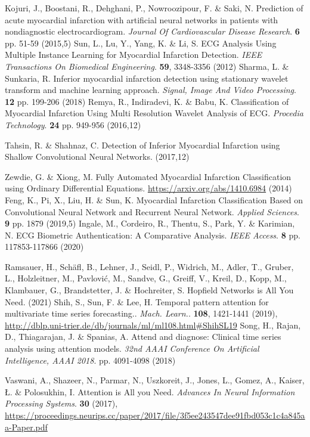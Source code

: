 \documentclass{ieeeaccess}
\begin{document}
\begin{thebibliography}{1}
Kojuri, J., Boostani, R., Dehghani, P., Nowroozipour, F. \& Saki, N. Prediction of acute myocardial infarction with artificial neural networks in patients with nondiagnostic electrocardiogram. {\em Journal Of Cardiovascular Disease Research}. \textbf{6} pp. 51-59 (2015,5)
Sun, L., Lu, Y., Yang, K. \& Li, S. ECG Analysis Using Multiple Instance Learning for Myocardial Infarction Detection. {\em IEEE Transactions On Biomedical Engineering}. \textbf{59}, 3348-3356 (2012)
Sharma, L. \& Sunkaria, R. Inferior myocardial infarction detection using stationary wavelet transform and machine learning approach. {\em Signal, Image And Video Processing}. \textbf{12} pp. 199-206 (2018)
Remya, R., Indiradevi, K. \& Babu, K. Classification of Myocardial Infarction Using Multi Resolution Wavelet Analysis of ECG. {\em Procedia Technology}. \textbf{24} pp. 949-956 (2016,12)

Tahsin, R. \& Shahnaz, C. Detection of Inferior Myocardial Infarction using Shallow Convolutional Neural Networks.  (2017,12)

Zewdie, G. \& Xiong, M. Fully Automated Myocardial Infarction Classification using Ordinary Differential Equations. \url{https://arxiv.org/abs/1410.6984} (2014)
Feng, K., Pi, X., Liu, H. \& Sun, K. Myocardial Infarction Classification Based on Convolutional Neural Network and Recurrent Neural Network. {\em Applied Sciences}. \textbf{9} pp. 1879 (2019,5)
Ingale, M., Cordeiro, R., Thentu, S., Park, Y. \& Karimian, N. ECG Biometric Authentication: A Comparative Analysis. {\em IEEE Access}. \textbf{8} pp. 117853-117866 (2020)

Ramsauer, H., Schäfl, B., Lehner, J., Seidl, P., Widrich, M., Adler, T., Gruber, L., Holzleitner, M., Pavlović, M., Sandve, G., Greiff, V., Kreil, D., Kopp, M., Klambauer, G., Brandstetter, J. \& Hochreiter, S. Hopfield Networks is All You Need.  (2021)
Shih, S., Sun, F. \& Lee, H. Temporal pattern attention for multivariate time series forecasting.. {\em Mach. Learn.}. \textbf{108}, 1421-1441 (2019), \url{http://dblp.uni-trier.de/db/journals/ml/ml108.html#ShihSL19}
Song, H., Rajan, D., Thiagarajan, J. \& Spanias, A. Attend and diagnose: Clinical time series analysis using attention models. {\em 32nd AAAI Conference On Artificial Intelligence, AAAI 2018}. pp. 4091-4098 (2018)


Vaswani, A., Shazeer, N., Parmar, N., Uszkoreit, J., Jones, L., Gomez, A., Kaiser, Ł. \& Polosukhin, I. Attention is All you Need. {\em Advances In Neural Information Processing Systems}. \textbf{30} (2017), \url{https://proceedings.neurips.cc/paper/2017/file/3f5ee243547dee91fbd053c1c4a845aa-Paper.pdf}


\end{thebibliography}
\end{document}
